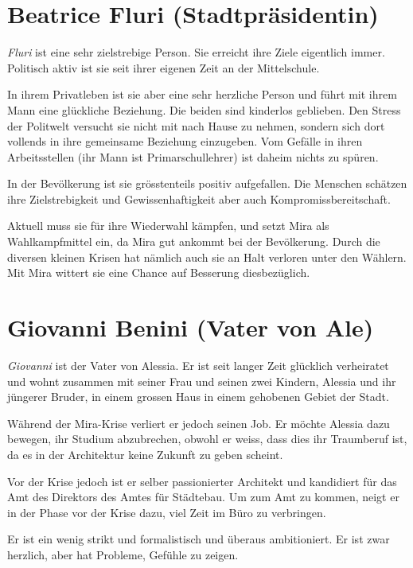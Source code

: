 \documentclass[11pt,a4paper,ngerman]{scrreprt}
\begin{document}
\section*{Beatrice Fluri (Stadtpräsidentin)}

\emph{Fluri} ist eine sehr zielstrebige Person. Sie erreicht ihre Ziele eigentlich
immer. Politisch aktiv ist sie seit ihrer eigenen Zeit an der Mittelschule.

In ihrem Privatleben ist sie aber eine sehr herzliche Person und führt mit ihrem
Mann eine glückliche Beziehung. Die beiden sind kinderlos geblieben. Den Stress
der Politwelt versucht sie nicht mit nach Hause zu nehmen, sondern sich dort
vollends in ihre gemeinsame Beziehung einzugeben. Vom Gefälle in ihren
Arbeitsstellen (ihr Mann ist Primarschullehrer) ist daheim nichts zu spüren.

In der Bevölkerung ist sie grösstenteils positiv aufgefallen. Die Menschen
schätzen ihre Zielstrebigkeit und Gewissenhaftigkeit aber auch
Kompromissbereitschaft.

Aktuell muss sie für ihre Wiederwahl kämpfen, und setzt Mira als Wahlkampfmittel
ein, da Mira gut ankommt bei der Bevölkerung. Durch die diversen kleinen Krisen
hat nämlich auch sie an Halt verloren unter den Wählern. Mit Mira wittert sie
eine Chance auf Besserung diesbezüglich.


\section*{Giovanni Benini (Vater von Ale)}

\emph{Giovanni} ist der Vater von Alessia. Er ist seit langer Zeit glücklich
verheiratet und wohnt zusammen mit seiner Frau und seinen zwei Kindern, Alessia
und ihr jüngerer Bruder, in einem grossen Haus in einem gehobenen Gebiet der
Stadt.

Während der Mira-Krise verliert er jedoch seinen Job. Er möchte Alessia dazu
bewegen, ihr Studium abzubrechen, obwohl er weiss, dass dies ihr Traumberuf ist,
da es in der Architektur keine Zukunft zu geben scheint.

Vor der Krise jedoch ist er selber passionierter Architekt und kandidiert für
das Amt des Direktors des Amtes für Städtebau. Um zum Amt zu kommen, neigt er in
der Phase vor der Krise dazu, viel Zeit im Büro zu verbringen.

Er ist ein wenig strikt und formalistisch und überaus ambitioniert.  Er ist zwar
herzlich, aber hat Probleme, Gefühle zu zeigen.
\end{document}
